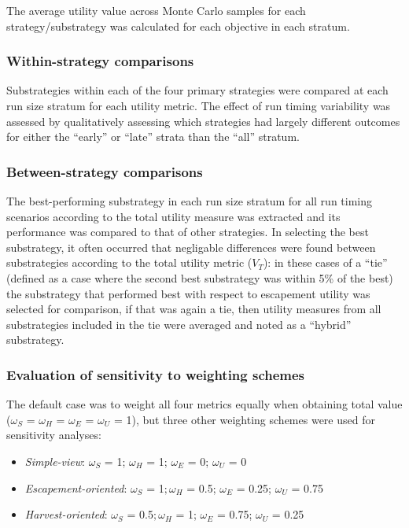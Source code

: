 \documentclass[12pt,]{book}
\theoremstyle{definition}
\theoremstyle{definition}
\theoremstyle{definition}
\theoremstyle{remark}
\begin{document}
\noindent
The average utility value across Monte Carlo samples for each
strategy/substrategy was calculated for each objective in each stratum.

\subsubsection{Within-strategy
comparisons}\label{within-strategy-comparisons}

\noindent
Substrategies within each of the four primary strategies were compared
at each run size stratum for each utility metric. The effect of run
timing variability was assessed by qualitatively assessing which
strategies had largely different outcomes for either the ``early'' or
``late'' strata than the ``all'' stratum.

\subsubsection{Between-strategy
comparisons}\label{between-strategy-comparisons}

\noindent
The best-performing substrategy in each run size stratum for all run
timing scenarios according to the total utility measure was extracted
and its performance was compared to that of other strategies. In
selecting the best substrategy, it often occurred that negligable
differences were found between substrategies according to the total
utility metric (\(V_T\)): in these cases of a ``tie'' (defined as a case
where the second best substrategy was within 5\% of the best) the
substrategy that performed best with respect to escapement utility was
selected for comparison, if that was again a tie, then utility measures
from all substrategies included in the tie were averaged and noted as a
``hybrid'' substrategy.

\subsubsection{Evaluation of sensitivity to weighting
schemes}\label{alt-weights}

\noindent
The default case was to weight all four metrics equally when obtaining
total value (\(\omega_S\) = \(\omega_H\) = \(\omega_E\) = \(\omega_U\) =
1), but three other weighting schemes were used for sensitivity
analyses:

\begin{itemize}
\item
  \emph{Simple-view}: \(\omega_S\) = 1; \(\omega_H\) = 1; \(\omega_E\) =
  0; \(\omega_U\) = 0
\item
  \emph{Escapement-oriented}: \(\omega_S\) = 1\(; \omega_H\) = 0.5;
  \(\omega_E\) = 0.25; \(\omega_U\) = 0.75
\item
  \emph{Harvest-oriented}: \(\omega_S\) = 0.5\(; \omega_H\) = 1;
  \(\omega_E\) = 0.75; \(\omega_U\) = 0.25
\end{itemize}
\end{document}
